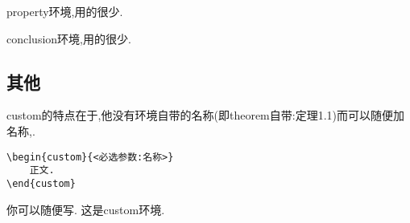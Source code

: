 \documentclass[lang=cn,12pt,scheme=chinese,mode=simple,black]{elegantbook}
\begin{document}
\begin{property}
    property环境,用的很少.
\end{property}

\begin{conclusion}
    conclusion环境,用的很少.
\end{conclusion}

\subsection{其他}
custom的特点在于,他没有环境自带的名称(即theorem自带:定理1.1)而可以随便加名称,.
\begin{lstlisting}
\begin{custom}{<必选参数:名称>}
    正文.
\end{custom}
\end{lstlisting}
\begin{custom}{你可以随便写.}
    这是custom环境.
\end{custom}
\end{document}
